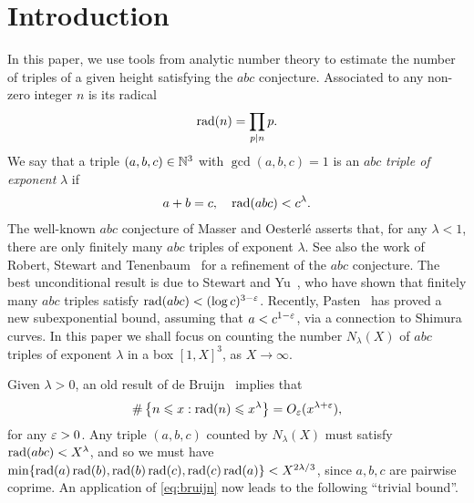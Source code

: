 %

\section{Introduction}

In this paper, we use tools from analytic number theory to estimate the number of triples of a given height satisfying the $abc$ conjecture.
Associated to any non-zero  integer $n$ is its radical
\begin{align*}
\operatorname{rad}(n)=\prod_{p\mid n}p.
\end{align*}
We say that a triple $(a,b,c)\in \mathbb{N}^3$
with $\gcd(a,b,c)=1$ is
 an $abc$ \emph{triple of exponent} $\lambda$ if
\begin{align*}
a+b=c,\quad \operatorname{rad}(abc) < c^{\lambda}.
\end{align*}
The well-known $abc$ conjecture of Masser and Oesterl\'e asserts that, for any $\lambda<1$, there are only finitely many $abc$ triples of exponent $\lambda$. See also the work of Robert, Stewart and Tenenbaum~\cite{tenenbaum} for a refinement of the $abc$ conjecture.
The   best unconditional result is  due to Stewart and Yu~\cite{styu}, who  have shown that  finitely many $abc$ triples satisfy $\operatorname{rad}(abc) < (\log c)^{3-\varepsilon}$. Recently, Pasten~\cite{hector} has proved a new subexponential bound, assuming that  $a<c^{1-\varepsilon}$, via a connection to Shimura curves.
In this paper we shall focus on counting the number $N_\lambda(X)$ of $abc$ triples of exponent $\lambda$ in a box $[1,X]^3$, as $X\to \infty$.

Given $\lambda>0$,
an old result of
de Bruijn~\cite{debruijn} implies that
\begin{equation}\label{eq:bruijn}
\#\left\{n\leqslant x : \operatorname{rad}(n)\leqslant x^\lambda\right\}=O_\varepsilon(x^{\lambda+\varepsilon}),
\end{equation}
for any $\varepsilon>0$. Any triple $(a,b,c)$ counted by
$N_\lambda(X)$ must satisfy $\operatorname{rad}(abc)< X^{\lambda}$, and so
we must have
$\min\{\operatorname{rad}(a)\operatorname{rad}(b),\operatorname{rad}(b)\operatorname{rad}(c),\operatorname{rad}(c)\operatorname{rad}(a)\}< X^{2\lambda/3}$, since $a,b,c$ are pairwise coprime.
An application of \eqref{eq:bruijn} now leads to the following ``trivial bound''.

